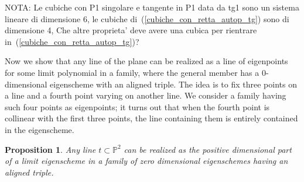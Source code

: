 \documentclass{amsart}
\theoremstyle{plain}
\newtheorem{prop}[lemma]{Proposition}
\theoremstyle{definition}
\newcommand{\p}{\mathbb{P}}
\begin{document}
NOTA: Le cubiche con P1 singolare e tangente in P1 data da tg1 sono
un sistema lineare di dimensione 6, le cubiche
di~(\ref{cubiche_con_retta_autop_tg}) sono di dimensione
4, Che altre proprieta' deve avere una cubica per rientrare
in~(\ref{cubiche_con_retta_autop_tg})?

\medskip
Now we show that any line of the plane can be realized as a line of eigenpoints for some limit polynomial in a family, where the general member has a $0$-dimensional eigenscheme with an aligned triple. The idea is to fix three points on a line and a fourth point varying on another line. We consider a family having such four points as eigenpoints; it turns out that when the fourth point is collinear with the first three points, the line containing them is entirely contained in the eigenscheme.

\begin{prop}
\label{prop:line_as_limit}
Any line $t \subset \p^2$ can be realized as the positive dimensional part of a limit eigenscheme in a family of zero dimensional eigenschemes having an aligned triple.
\end{prop}
\end{document}
